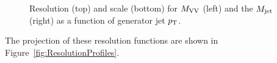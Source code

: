 \begin{figure}[h!]
\caption{Resolution (top) and scale (bottom) for $M_{\rm VV}$ (left) and the $M_{\rm jet}$ (right) as a function of generator jet $p_{\mathrm{T}}$.}
\label{fig:ScaleResolution}
\end{figure}
The projection of these resolution functions are shown in Figure~\ref{fig:ResolutionProfiles}.
